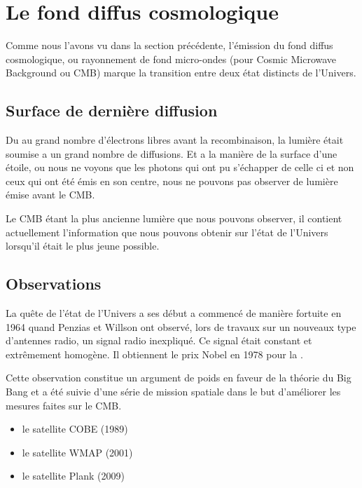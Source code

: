 \section{Le fond diffus cosmologique}
\label{sec:CMB}

Comme nous l'avons vu dans la section précédente, l’émission du fond diffus cosmologique, ou rayonnement de fond micro-ondes (pour Cosmic Microwave Background ou CMB) marque la transition entre deux état distincts de l'Univers.



\subsection{Surface de dernière diffusion}

Du au grand nombre d'électrons libres avant la recombinaison, la lumière était soumise a un grand nombre de diffusions.
Et a la manière de la surface d'une étoile, ou nous ne voyons que les photons qui ont pu s’échapper de celle ci et non ceux qui ont été émis en son centre, nous ne pouvons pas observer de lumière émise avant le CMB.

Le CMB étant la plus ancienne lumière que nous pouvons observer, il contient actuellement l'information que nous pouvons obtenir sur l'état de l'Univers lorsqu'il était le plus jeune possible.


\subsection{Observations}

La quête de l'état de l'Univers a ses début a commencé de manière fortuite en 1964 quand Penzias et Willson ont observé, lors de travaux sur un nouveaux type d’antennes radio, un signal radio inexpliqué.
Ce signal était constant et extrêmement homogène.
Il obtiennent le prix Nobel en 1978 pour la \cite{PenziasWilsonNobel}.

Cette observation constitue un argument de poids en faveur de la théorie du Big Bang 
et a été suivie d'une série de mission spatiale dans le but d'améliorer les mesures faites sur le CMB.

\begin{itemize}
\item le satellite COBE (1989)
\item le satellite WMAP (2001)
\item le satellite Plank (2009)
\end{itemize}




